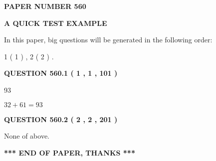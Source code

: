 \documentclass[12pt]{article}
\begin{document}
   
\newpage 
\setcounter{page}{ 
   560001 } 
   
   
   
   
 {\textbf{ \Large{ PAPER NUMBER  560  }}}
   
   
\vspace{0.2in}
   
   
   
   
   
   
 \vspace{0.2in}
{\LARGE {\textbf{ A QUICK TEST EXAMPLE}}}
   
   
   
\vspace{0.2in}
   
In this paper, big questions will be generated in the following order: 
   
   
   1 ( 1 )
 ,
   2 ( 2 )
 .
  
\vspace{0.2in}
  
{\textbf{\Large{QUESTION
560.1 
 ( 1 , 1 , 101 )
}}}
  
  
 
 
\noindent{}

93
 
 
 
 
\noindent{}

$ %
32 +  %
61=   %
93$
 
 
  
\vspace{0.2in}
  
{\textbf{\Large{QUESTION
560.2 
 ( 2 , 2 , 201 )
}}}
  
  
 
 
\noindent{}
 
 
 None of above.
 
 
 
 
   
   
 \vspace{0.2in}
 
   
   
   
   
\vspace{1.0in} 
{\textbf{\large{ *** END OF PAPER, THANKS *** }}} 
   
\end{document}
